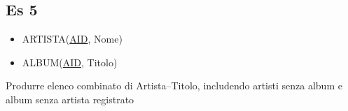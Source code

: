 \subsection{Es 5}
\begin{itemize}
    \item ARTISTA(\underline{AID}, Nome)
    \item ALBUM(\underline{AID}, Titolo)
\end{itemize}
Produrre elenco combinato di Artista--Titolo, includendo artisti senza album e album senza artista registrato